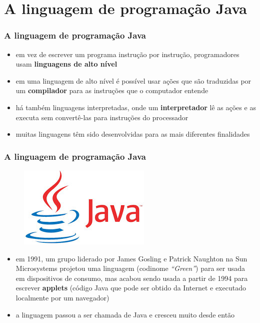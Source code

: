 \documentclass[aspectratio=169]{beamer}
\begin{document}
\section{A linguagem de programação Java}

\begin{frame}\frametitle{A linguagem de programação Java}
\begin{itemize}
	\item em vez de escrever um programa instrução por instrução, programadores usam \textbf{linguagens de alto nível}
	\item em uma linguagem de alto nível é possível usar ações que são traduzidas por um \textbf{compilador} para as instruções que o computador entende
	\item há também linguagens interpretadas, onde um \textbf{interpretador} lê as ações e as executa sem convertê-las para instruções do processador
	\item muitas linguagens têm sido desenvolvidas para as mais diferentes finalidades
\end{itemize}
\end{frame}

\begin{frame}\frametitle{A linguagem de programação Java}
\begin{figure}[h]
	\centering
	\includegraphics[height=0.2\paperheight]{pucrs-ep-fprog-unidade_01-introducao-laminas-java.jpg}
\end{figure}
\begin{itemize}
	\item em 1991, um grupo liderado por James Gosling e Patrick Naughton na Sun Microsystems projetou uma linguagem (codinome \emph{``Green''}) para ser usada em dispositivos de consumo, mas acabou sendo usada a partir de 1994 para escrever \textbf{applets} (código Java que pode ser obtido da Internet e executado localmente por um navegador)
	\item a linguagem passou a ser chamada de Java e cresceu muito desde então
\end{itemize}
\end{frame}
\end{document}
